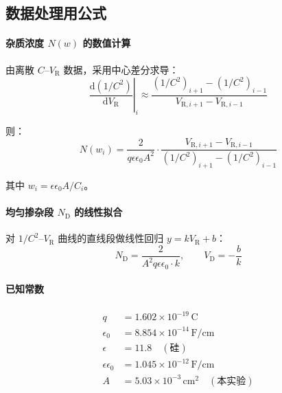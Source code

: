 \subsection*{数据处理用公式}

\paragraph{杂质浓度 $N(w)$ 的数值计算}

由离散 $C$--$V_{\mathrm{R}}$ 数据，采用中心差分求导：
\begin{equation}
\left.\frac{\mathrm{d}(1/C^{2})}{\mathrm{d}V_{\mathrm{R}}}\right|_{i}
\approx \frac{(1/C^{2})_{i+1} - (1/C^{2})_{i-1}}{V_{\mathrm{R},i+1} - V_{\mathrm{R},i-1}}
\end{equation}

则：
\begin{equation}
N(w_{i}) = \frac{2}{q\epsilon\epsilon_0 A^{2}}
\cdot \frac{V_{\mathrm{R},i+1} - V_{\mathrm{R},i-1}}{(1/C^{2})_{i+1} - (1/C^{2})_{i-1}}
\end{equation}

其中 $w_{i} = \epsilon\epsilon_0 A / C_{i}$。

\paragraph{均匀掺杂段 $N_{\mathrm{D}}$ 的线性拟合}

对 $1/C^{2}$--$V_{\mathrm{R}}$ 曲线的直线段做线性回归 $y = kV_{\mathrm{R}} + b$：
\begin{equation}
N_{\mathrm{D}} = \frac{2}{A^{2}q\epsilon\epsilon_0 \cdot k},\qquad
V_{\mathrm{D}} = -\frac{b}{k}
\end{equation}

\paragraph{已知常数}
\begin{align}
q &= 1.602 \times 10^{-19}\,\mathrm{C} \\
\epsilon_0 &= 8.854 \times 10^{-14}\,\mathrm{F/cm} \\
\epsilon &= 11.8 \quad (\text{硅}) \\
\epsilon\epsilon_0 &= 1.045 \times 10^{-12}\,\mathrm{F/cm} \\
A &= 5.03 \times 10^{-3}\,\mathrm{cm}^{2} \quad (\text{本实验})
\end{align}

